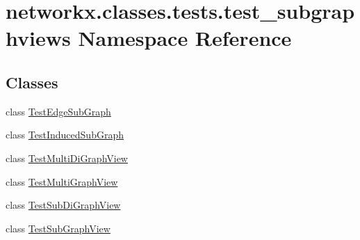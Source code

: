 \hypertarget{namespacenetworkx_1_1classes_1_1tests_1_1test__subgraphviews}{}\section{networkx.\+classes.\+tests.\+test\+\_\+subgraphviews Namespace Reference}
\label{namespacenetworkx_1_1classes_1_1tests_1_1test__subgraphviews}
\subsection*{Classes}
\begin{DoxyCompactItemize}
\item 
class \hyperlink{classnetworkx_1_1classes_1_1tests_1_1test__subgraphviews_1_1TestEdgeSubGraph}{Test\+Edge\+Sub\+Graph}
\item 
class \hyperlink{classnetworkx_1_1classes_1_1tests_1_1test__subgraphviews_1_1TestInducedSubGraph}{Test\+Induced\+Sub\+Graph}
\item 
class \hyperlink{classnetworkx_1_1classes_1_1tests_1_1test__subgraphviews_1_1TestMultiDiGraphView}{Test\+Multi\+Di\+Graph\+View}
\item 
class \hyperlink{classnetworkx_1_1classes_1_1tests_1_1test__subgraphviews_1_1TestMultiGraphView}{Test\+Multi\+Graph\+View}
\item 
class \hyperlink{classnetworkx_1_1classes_1_1tests_1_1test__subgraphviews_1_1TestSubDiGraphView}{Test\+Sub\+Di\+Graph\+View}
\item 
class \hyperlink{classnetworkx_1_1classes_1_1tests_1_1test__subgraphviews_1_1TestSubGraphView}{Test\+Sub\+Graph\+View}
\end{DoxyCompactItemize}

